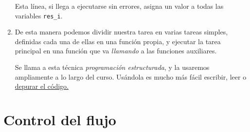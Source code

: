 \begin{enumerate}
Esta línea, si llega a ejecutarse sin errores, asigna un valor a todas las
variables {\tt res\_i}. 
 
 \item De esta manera podemos dividir nuestra tarea en varias tareas simples,
definidas cada una de ellas en una función propia, y ejecutar la tarea
principal en una función que va {\itshape llamando} a las funciones
auxiliares. 

Se llama a esta técnica {\itshape programación estructurada}, y la usaremos
ampliamente a lo largo del curso. Usándola es mucho más fácil escribir,
leer o \hyperref[depurar]{depurar  el código.}  
 
\end{enumerate}



\section{Control del flujo}


